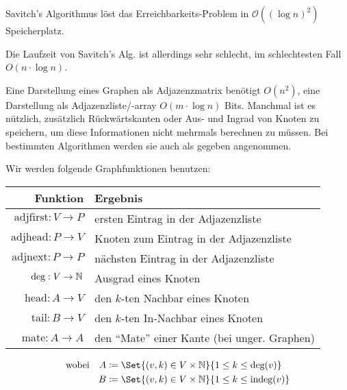\documentclass{cheat-sheet}
\renewcommand{\O}{\mathcal{O}} %
\begin{document}
\begin{lem}
  Savitch's Algorithmus löst das Erreichbarkeits-Problem in $\O((\log n)^2)$ Speicherplatz.
\end{lem}

\begin{bem}
  Die Laufzeit von Savitch's Alg. ist allerdings sehr schlecht, im schlechtesten Fall $O(n \cdot \log n)$.
\end{bem}




\begin{bem}
  Eine Darstellung eines Graphen als Adjazenzmatrix benötigt $O(n^2)$, eine Darstellung als Adjazenzliste/-array $O(m \cdot \log n)$ Bits.
  Manchmal ist es nützlich, zusätzlich Rückwärtskanten oder Aus- und Ingrad von Knoten zu speichern, um diese Informationen nicht mehrmals berechnen zu müssen. Bei bestimmten Algorithmen werden sie auch als gegeben angenommen.
\end{bem}


\begin{konv}
  Wir werden folgende Graphfunktionen benutzen:
  
  \begin{tabular}{r l}
    Funktion & Ergebnis \\[3pt] \hline
    $\text{adjfirst} : V \to P$ & ersten Eintrag in der Adjazenzliste \\
    $\text{adjhead} : P \to V$ & Knoten zum Eintrag in der Adjazenzliste \\
    $\text{adjnext} : P \to P$ & nächsten Eintrag in der Adjazenzliste \\
    $\text{deg} : V \to \mathbb{N}$ & Ausgrad eines Knoten \\
    $\text{head} : A \to V$ & den $k$-ten Nachbar eines Knoten \\
    $\text{tail} : B \to V$ & den $k$-ten In-Nachbar eines Knoten \\
    $\text{mate} : A \to A$ & den "`Mate"' einer Kante (bei unger. Graphen)
  \end{tabular}
  \begin{align*}
    \text{wobei} \quad
    A &\coloneqq \Set{(v, k) \in V \times \N}{1 \leq k \leq \text{deg}(v)} \\
    B &\coloneqq \Set{(v, k) \in V \times \N}{1 \leq k \leq \text{indeg}(v)}
  \end{align*}
\end{konv}
\end{document}

